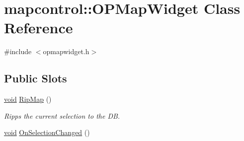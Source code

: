 \hypertarget{classmapcontrol_1_1_o_p_map_widget}{\section{mapcontrol\-:\-:\-O\-P\-Map\-Widget \-Class \-Reference}
\label{classmapcontrol_1_1_o_p_map_widget}
}


{\ttfamily \#include $<$opmapwidget.\-h$>$}

\subsection*{\-Public \-Slots}
\begin{DoxyCompactItemize}
\item 
\hyperlink{group___u_a_v_objects_plugin_ga444cf2ff3f0ecbe028adce838d373f5c}{void} \hyperlink{group___o_p_map_widget_ga3cc1af46a4555caac4d2bcafc775dd3c}{\-Rip\-Map} ()
\begin{DoxyCompactList}\small\item\em \-Ripps the current selection to the \-D\-B. \end{DoxyCompactList}\item 
\hyperlink{group___u_a_v_objects_plugin_ga444cf2ff3f0ecbe028adce838d373f5c}{void} \hyperlink{group___o_p_map_widget_gaebc469fcc05092fd93d332b528eae3e5}{\-On\-Selection\-Changed} ()
\end{DoxyCompactItemize}
